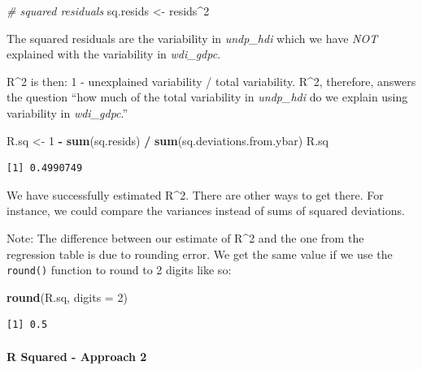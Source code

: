 \documentclass[]{article}
\newenvironment{Shaded}{\begin{snugshade}}{\end{snugshade}}
\newcommand{\KeywordTok}[1]{\textcolor[rgb]{0.13,0.29,0.53}{\textbf{#1}}}
\newcommand{\DataTypeTok}[1]{\textcolor[rgb]{0.13,0.29,0.53}{#1}}
\newcommand{\DecValTok}[1]{\textcolor[rgb]{0.00,0.00,0.81}{#1}}
\newcommand{\StringTok}[1]{\textcolor[rgb]{0.31,0.60,0.02}{#1}}
\newcommand{\CommentTok}[1]{\textcolor[rgb]{0.56,0.35,0.01}{\textit{#1}}}
\newcommand{\OperatorTok}[1]{\textcolor[rgb]{0.81,0.36,0.00}{\textbf{#1}}}
\newcommand{\NormalTok}[1]{#1}
\let\oldparagraph\paragraph
\renewcommand{\paragraph}[1]{\oldparagraph{#1}\mbox{}}
\theoremstyle{definition}
\theoremstyle{definition}
\theoremstyle{definition}
\theoremstyle{remark}
\begin{document}
\begin{Shaded}
\begin{Highlighting}[]
\CommentTok{# squared residuals}
\NormalTok{sq.resids <-}\StringTok{ }\NormalTok{resids}\OperatorTok{^}\DecValTok{2}
\end{Highlighting}
\end{Shaded}

The squared residuals are the variability in \emph{undp\_hdi} which we
have \emph{NOT} explained with the variability in \emph{wdi\_gdpc}.

R\^{}2 is then: 1 - unexplained variability / total variability. R\^{}2,
therefore, answers the question ``how much of the total variability in
\emph{undp\_hdi} do we explain using variability in \emph{wdi\_gdpc}.''

\begin{Shaded}
\begin{Highlighting}[]
\NormalTok{R.sq <-}\StringTok{ }\DecValTok{1} \OperatorTok{-}\StringTok{ }\KeywordTok{sum}\NormalTok{(sq.resids) }\OperatorTok{/}\StringTok{ }\KeywordTok{sum}\NormalTok{(sq.deviations.from.ybar)}
\NormalTok{R.sq}
\end{Highlighting}
\end{Shaded}

\begin{verbatim}
[1] 0.4990749
\end{verbatim}

We have successfully estimated R\^{}2. There are other ways to get
there. For instance, we could compare the variances instead of sums of
squared deviations.

Note: The difference between our estimate of R\^{}2 and the one from the
regression table is due to rounding error. We get the same value if we
use the \texttt{round()} function to round to 2 digits like so:

\begin{Shaded}
\begin{Highlighting}[]
\KeywordTok{round}\NormalTok{(R.sq, }\DataTypeTok{digits =} \DecValTok{2}\NormalTok{)}
\end{Highlighting}
\end{Shaded}

\begin{verbatim}
[1] 0.5
\end{verbatim}

\paragraph{R Squared - Approach 2}\label{r-squared---approach-2}
\end{document}
